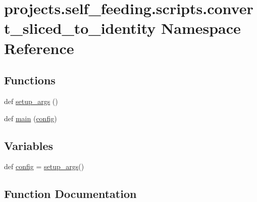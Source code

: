 \hypertarget{namespaceprojects_1_1self__feeding_1_1scripts_1_1convert__sliced__to__identity}{}\section{projects.\+self\+\_\+feeding.\+scripts.\+convert\+\_\+sliced\+\_\+to\+\_\+identity Namespace Reference}
\label{namespaceprojects_1_1self__feeding_1_1scripts_1_1convert__sliced__to__identity}
\subsection*{Functions}
\begin{DoxyCompactItemize}
\item 
def \hyperlink{namespaceprojects_1_1self__feeding_1_1scripts_1_1convert__sliced__to__identity_aea494b2057e7cfdbd2ecd268327400c4}{setup\+\_\+args} ()
\item 
def \hyperlink{namespaceprojects_1_1self__feeding_1_1scripts_1_1convert__sliced__to__identity_a330625b0a6e9b8fc90da17503b083312}{main} (\hyperlink{namespaceprojects_1_1self__feeding_1_1scripts_1_1convert__sliced__to__identity_a720cab62e48cdb64072d4fbe640167e6}{config})
\end{DoxyCompactItemize}
\subsection*{Variables}
\begin{DoxyCompactItemize}
\item 
def \hyperlink{namespaceprojects_1_1self__feeding_1_1scripts_1_1convert__sliced__to__identity_a720cab62e48cdb64072d4fbe640167e6}{config} = \hyperlink{namespaceprojects_1_1self__feeding_1_1scripts_1_1convert__sliced__to__identity_aea494b2057e7cfdbd2ecd268327400c4}{setup\+\_\+args}()
\end{DoxyCompactItemize}


\subsection{Function Documentation}
\mbox{\label{namespaceprojects_1_1self__feeding_1_1scripts_1_1convert__sliced__to__identity_a330625b0a6e9b8fc90da17503b083312}} 
